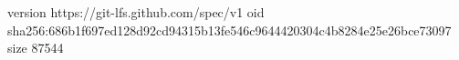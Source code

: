 version https://git-lfs.github.com/spec/v1
oid sha256:686b1f697ed128d92cd94315b13fe546c9644420304c4b8284e25e26bce73097
size 87544
